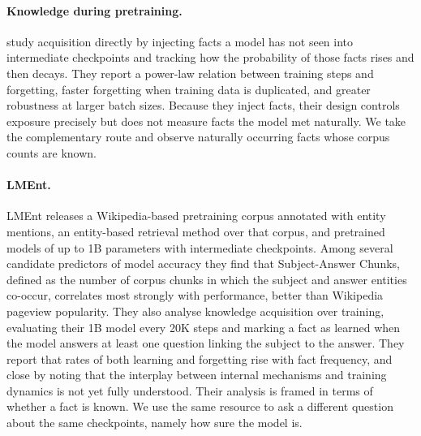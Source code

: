 \documentclass[11pt]{article}
\begin{document}
\paragraph{Knowledge during pretraining.}
\citet{chang-etal-2024-large} study acquisition directly by injecting facts a model has not seen
into intermediate checkpoints and tracking how the probability of those facts rises and then
decays. They report a power-law relation between training steps and forgetting, faster forgetting
when training data is duplicated, and greater robustness at larger batch sizes. Because they
inject facts, their design controls exposure precisely but does not measure facts the model met
naturally. We take the complementary route and observe naturally occurring facts whose corpus
counts are known.

\paragraph{LMEnt.}
LMEnt \citep{gottesman-etal-2026-lment} releases a Wikipedia-based pretraining corpus annotated
with entity mentions, an entity-based retrieval method over that corpus, and pretrained models of
up to 1B parameters with intermediate checkpoints. Among several candidate predictors of model
accuracy they find that Subject-Answer Chunks, defined as the number of corpus chunks in which
the subject and answer entities co-occur, correlates most strongly with performance, better than
Wikipedia pageview popularity. They also analyse knowledge acquisition over training, evaluating
their 1B model every 20K steps and marking a fact as learned when the model answers at least one
question linking the subject to the answer. They report that rates of both learning and
forgetting rise with fact frequency, and close by noting that the interplay between internal
mechanisms and training dynamics is not yet fully understood. Their analysis is framed in terms
of whether a fact is known. We use the same resource to ask a different question about the same
checkpoints, namely how sure the model is.
\end{document}
